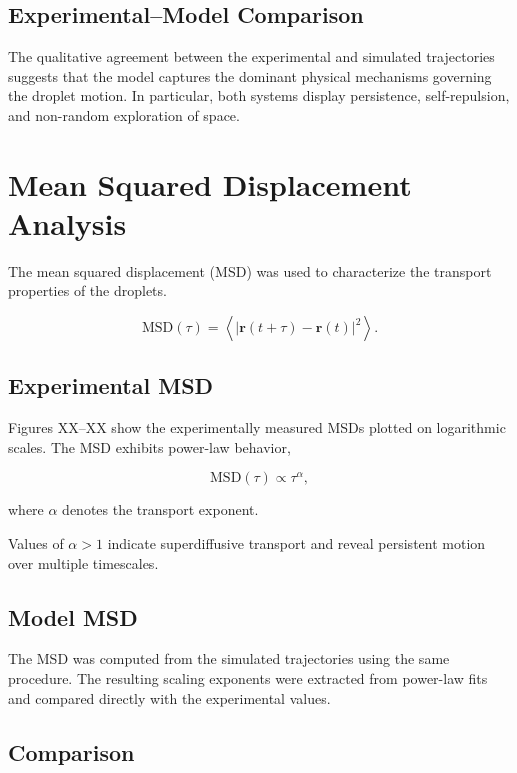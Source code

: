 \subsection{Experimental--Model Comparison}

The qualitative agreement between the experimental and simulated trajectories suggests that the model captures the dominant physical mechanisms governing the droplet motion. In particular, both systems display persistence, self-repulsion, and non-random exploration of space.

\section{Mean Squared Displacement Analysis}

The mean squared displacement (MSD) was used to characterize the transport properties of the droplets.

\begin{equation}
\mathrm{MSD}(\tau) = \left\langle |\mathbf r(t+\tau)-\mathbf r(t)|^2 \right\rangle.
\end{equation}

\subsection{Experimental MSD}

Figures XX--XX show the experimentally measured MSDs plotted on logarithmic scales. The MSD exhibits power-law behavior,

\begin{equation}
\mathrm{MSD}(\tau)
\propto
\tau^\alpha,
\end{equation}

where $\alpha$ denotes the transport exponent.

Values of $\alpha > 1$ indicate superdiffusive transport and reveal persistent motion over multiple timescales.

\subsection{Model MSD}

The MSD was computed from the simulated trajectories using the same procedure. The resulting scaling exponents were extracted from power-law fits and compared directly with the experimental values.

\subsection{Comparison}


